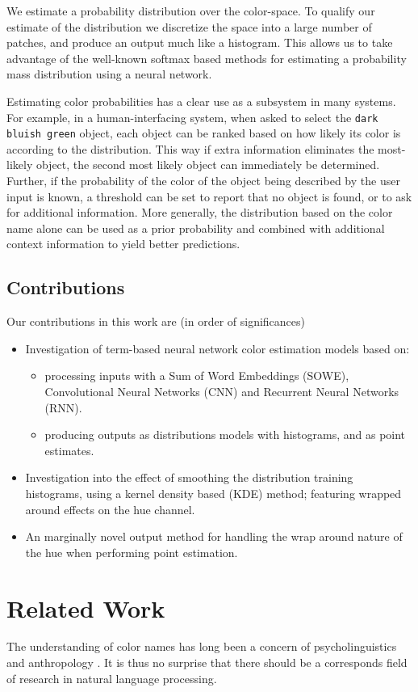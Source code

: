 \documentclass[11pt,a4paper]{article}
\newcommand{\parencite}{\citep}
\begin{document}
We estimate a probability distribution over the color-space.
To qualify our estimate of the distribution we discretize the space into a large number of patches, and produce an output much like a histogram.
This allows us to take advantage of the well-known softmax based methods for estimating a probability mass distribution using a neural network.


Estimating color probabilities has a clear use as a subsystem in many systems.
For example, in a human-interfacing system, when asked to select the \texttt{dark bluish green} object, each object can be ranked based on how likely its color is according to the distribution.
This way if extra information eliminates the most-likely object, the second most likely object can immediately be determined.
Further, if the probability of the color of the object being described by the user input is known, a threshold can be set to report that no object is found, or to ask for additional information.
More generally, the distribution based on the color name alone can be used as a prior probability and combined with additional context information to yield better predictions.

\subsection{Contributions}
Our contributions in this work are (in order of significances)
\begin{itemize}
	\item Investigation of term-based neural network color estimation models based on:
	\begin{itemize}
		\item processing inputs with a Sum of Word Embeddings (SOWE), Convolutional Neural Networks (CNN) and Recurrent Neural Networks (RNN).
		\item producing outputs as distributions models with histograms, and as point estimates.
	\end{itemize}
	\item Investigation into the effect of smoothing the distribution training histograms, using a kernel density based (KDE) method; featuring wrapped around effects on the hue channel.
	\item An marginally novel output method for handling the wrap around nature of the hue when performing point estimation.
\end{itemize}



\section{Related Work}\label{sec:related-work}
The understanding of color names has long been a concern of psycholinguistics and anthropology  \parencite{berlin1969basic,heider1972universals,HEIDER1972337,mylonas2015use}.
It is thus no surprise that there should be a corresponds field of research in natural language processing.
\end{document}
